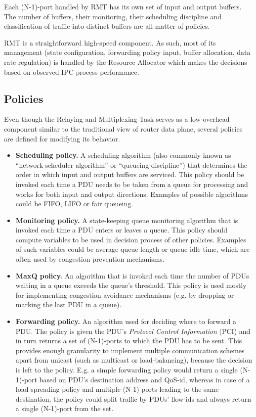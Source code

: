             Each (N-1)-port handled by RMT has its own set of input and output buffers. The number of buffers, their monitoring, their scheduling discipline and classification of traffic into distinct buffers are all matter of policies.

            RMT is a straightforward high-speed component. As such, most of its management (state configuration, forwarding policy input, buffer allocation, data rate regulation) is handled by the Resource Allocator which makes the decisions based on observed IPC process performance.


        \subsection{Policies}

            Even though the Relaying and Multiplexing Task serves as a low-overhead component similar to the traditional view of router data plane, several policies are defined for modifying its behavior.

            \begin{itemize}
                \item \textbf{Scheduling policy.} A scheduling algorithm (also commonly known as ``network scheduler algorithm'' or ``queueing discipline'') that determines the order in which input and output buffers are serviced. This policy should be invoked each time a PDU needs to be taken from a queue for processing and works for both input and output directions. Examples of possible algorithms could be FIFO, LIFO or fair queueing.
                \item \textbf{Monitoring policy.} A state-keeping queue monitoring algorithm that is invoked each time a PDU enters or leaves a queue. This policy should compute variables to be used in decision process of other policies. Examples of such variables could be average queue length or queue idle time, which are often used by congestion prevention mechanisms.
                \item \textbf{MaxQ policy.} An algorithm that is invoked each time the number of PDUs waiting in a queue exceeds the queue's threshold. This policy is used mostly for implementing congestion avoidance mechanisms (e.g. by dropping or marking the last PDU in a queue).
                \item \textbf{Forwarding policy.} An algorithm used for deciding where to forward a PDU. The policy is given the PDU's \emph{Protocol Control Information} (PCI) and in turn returns a set of (N-1)-ports to which the PDU has to be sent. This provides enough granularity to implement multiple communication schemes apart from unicast (such as multicast or load-balancing), because the decision is left to the policy. E.g. a simple forwarding policy would return a single (N-1)-port based on PDU's destination address and QoS-id, whereas in case of a load-spreading policy and multiple (N-1)-ports leading to the same destination, the policy could split traffic by PDUs' flow-ids and always return a single (N-1)-port from the set.
            \end{itemize}



